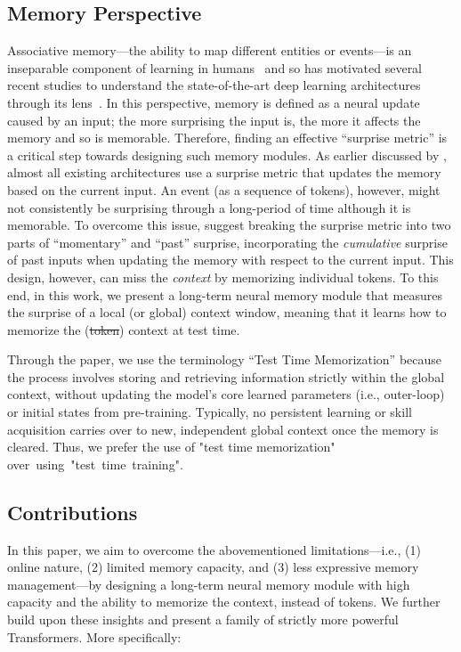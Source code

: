 \subsection*{Memory Perspective}
Associative memory—the ability to map different entities or events—is an inseparable component of learning in humans~\citep{terry2017learning} and so has motivated several recent studies to understand the state-of-the-art deep learning architectures through its lens~\citep{ramsauer2021hopfield, behrouz2024titans, behrouz2025Miras, wang2025test}. In this perspective, memory is defined as a neural update caused by an input; the more surprising the input is, the more it affects the memory and so is memorable. Therefore, finding an effective ``surprise metric'' is a critical step towards designing such memory modules. As earlier discussed by \citet{behrouz2025Miras, behrouz2024titans}, almost all existing architectures use a surprise metric that updates the memory based on the current input. An event (as a sequence of tokens), however, might not consistently be surprising through a long-period of time although it is memorable. To overcome this issue, \citet{behrouz2024titans} suggest breaking the surprise metric into two parts of ``momentary'' and ``past'' surprise, incorporating the \emph{cumulative} surprise of past inputs when updating the memory with respect to the current input. This design, however, can miss the \emph{context} by memorizing individual tokens. To this end, in this work, we present a long-term neural memory module that measures the surprise of a local (or global) context window, meaning that it learns how to memorize the (\st{token}) context at test time. 


Through the paper, we use the terminology ``Test Time Memorization'' because the process involves storing and retrieving information strictly within the global context, without updating the model's core learned parameters (i.e., outer-loop) or initial states from pre-training. Typically, no persistent learning or skill acquisition carries over to new, independent global context once the memory is cleared. Thus, we prefer the use of "test time memorization" over~using~"test~time~training".


\subsection*{Contributions}
In this paper, we aim to overcome the abovementioned limitations—i.e., (1) online nature, (2) limited memory capacity, and (3) less expressive memory management—by designing a long-term neural memory module with high capacity and the ability to memorize the context, instead of tokens. We further build upon these insights and present a family of strictly more powerful Transformers. More specifically:


